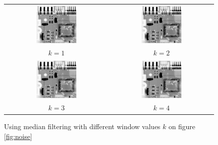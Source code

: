 \documentclass[a4paper]{article}
\begin{document}
\begin{enumerate}
\begin{figure}[H]
\centering
\begin{tabular}{cc}
    \includegraphics[width=0.4\textwidth]{../lab2ex3/restored1.png} &
    \includegraphics[width=0.4\textwidth]{../lab2ex3/restored2.png}\\
    $k = 1$ & $k = 2$ \\
    \includegraphics[width=0.4\textwidth]{../lab2ex3/restored3.png} &
    \includegraphics[width=0.4\textwidth]{../lab2ex3/restored4.png}\\
    $k = 3$ & $k = 4$
    
\end{tabular}
\caption{Using median filtering with different window values $k$ on figure \ref{fig:noise}} 
\end{figure}




\end{enumerate}
\end{document}
